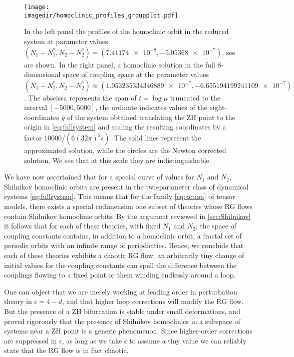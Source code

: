 \begin{figure}
    \texttt{[image: \\imagedir/homoclinic\_profiles\_groupplot.pdf]}
    \caption{In the left panel the profiles of the homoclinic orbit in the reduced system at parameter values $(N_1-N_1^*,N_2-N_2^*)=( \num{7.41174e-8},\num{-5.05368e-7})$, see  are shown. In the right panel, a homoclinic solution in the full 8-dimensional space of coupling space at the parameter values $(N_1-N_1^*, N_2-N_2^*)\approx(\num{1.053235334346889e-7}, \num{-6.655194199241109e-7})$. The abscissa represents the span of $t=\log \mu$ truncated to the interval $[-5000, 5000]$, the ordinate indicates values of the eight-coordinates $\bar g$ of the system obtained translating the ZH point to the origin in \cref{eq:fullsystem} and scaling the resulting coordinates by a factor $10000/(6(32\pi)^2\epsilon)$.
    The solid lines represent the approximated solution, while the circles are the Newton corrected solution. We see that at this scale they are indistinguishable.
     }
    \label{fig:homoclinic1_profiles}
\end{figure}


We have now ascertained that for a special curve of values for $N_1$ and $N_2$, Shilnikov homoclinic orbits are present in the two-parameter class of dynamical systems \cref{eq:fullsystem}. This means that for the family \cref{eq:action} of tensor models, there exists a special codimension one subset of theories whose RG flows contain Shilnikov homoclinic orbits. By the argument reviewed in \cref{sec:Shilnikov} it follows that for each of these theories, with fixed $N_1$ and $N_2$, the space of coupling constants contains, in addition to a homoclinic orbit, a fractal set of periodic orbits with an infinite range of periodicities. Hence, we conclude that each of these theories exhibits a chaotic RG flow: an arbitrarily tiny change of initial values for the coupling constants can spell the difference between the couplings flowing to a fixed point or them winding endlessly around a loop.

One can object that we are merely working at leading order in perturbation theory in $\epsilon = 4-d$, and that higher loop corrections will modify the RG flow. But the presence of a ZH bifurcation is stable under small deformations, and \cite{baldoma2020hopf} proved rigorously that the presence of Shilnikov homoclinics in a subspace of systems near a ZH point is a generic phenomenon. Since higher-order corrections are suppressed in $\epsilon$, as long as we take $\epsilon$ to assume a tiny value we can reliably state that the RG flow is in fact chaotic. 

